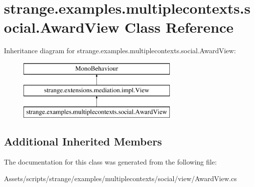 \hypertarget{classstrange_1_1examples_1_1multiplecontexts_1_1social_1_1_award_view}{\section{strange.\-examples.\-multiplecontexts.\-social.\-Award\-View Class Reference}
\label{classstrange_1_1examples_1_1multiplecontexts_1_1social_1_1_award_view}
}
Inheritance diagram for strange.\-examples.\-multiplecontexts.\-social.\-Award\-View\-:\begin{figure}[H]
\begin{center}
\leavevmode
\includegraphics[height=3.000000cm]{classstrange_1_1examples_1_1multiplecontexts_1_1social_1_1_award_view}
\end{center}
\end{figure}
\subsection*{Additional Inherited Members}


The documentation for this class was generated from the following file\-:\begin{DoxyCompactItemize}
\item 
Assets/scripts/strange/examples/multiplecontexts/social/view/Award\-View.\-cs\end{DoxyCompactItemize}
